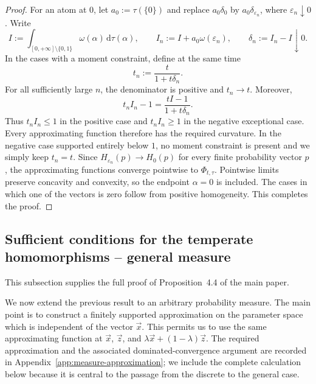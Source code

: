 \documentclass[aps,pra,11pt,onecolumn,nofootinbib,tightenlines]{revtex4-2}
\theoremstyle{definition}
\begin{document}
\begin{proof}
For an atom at $0$, let $a_0:=\tau(\{0\})$ and replace $a_0\delta_0$ by $a_0\delta_{\varepsilon_n}$, where $\varepsilon_n\downarrow0$. Write
\begin{equation}
 I:=\int_{[0,+\infty]\setminus\{0,1\}}\omega(\alpha)\,\mathrm d\tau(\alpha),
 \qquad
 I_n:=I+a_0\omega(\varepsilon_n),
 \qquad
 \delta_n:=I_n-I\downarrow0.
 \label{eq:endpoint-zero-moments}
\end{equation}
In the cases with a moment constraint, define at the same time
\begin{equation}
 t_n:=\frac{t}{1+t\delta_n}.
 \label{eq:endpoint-zero-t-n}
\end{equation}
For all sufficiently large $n$, the denominator is positive and $t_n\to t$. Moreover,
\begin{equation}
 t_nI_n-1
 =\frac{tI-1}{1+t\delta_n}.
 \label{eq:endpoint-zero-sign-preservation}
\end{equation}
Thus $t_nI_n\leq1$ in the positive case and $t_nI_n\geq1$ in the negative exceptional case. Every approximating function therefore has the required curvature. In the negative case supported entirely below $1$, no moment constraint is present and we simply keep $t_n=t$. Since $H_{\varepsilon_n}(p)\to H_0(p)$ for every finite probability vector $p$, the approximating functions converge pointwise to $\Phi_{t,\tau}$. Pointwise limits preserve concavity and convexity, so the endpoint $\alpha=0$ is included. The cases in which one of the vectors is zero follow from positive homogeneity. This completes the proof.
\end{proof}

\subsection{Sufficient conditions for the temperate homomorphisms -- general measure}
\label{sec:common-discretisation}

This subsection supplies the full proof of Proposition~4.4 of the main paper.

We now extend the previous result to an arbitrary probability measure. The main point is to construct a finitely supported approximation on the parameter space which is independent of the vector $\vec x$. This permits us to use the same approximating function at $\vec x$, $\vec z$, and $\lambda\vec x+(1-\lambda)\vec z$. The required approximation and the associated dominated-convergence argument are recorded in Appendix~\ref{app:measure-approximation}; we include the complete calculation below because it is central to the passage from the discrete to the general case.
\end{document}
